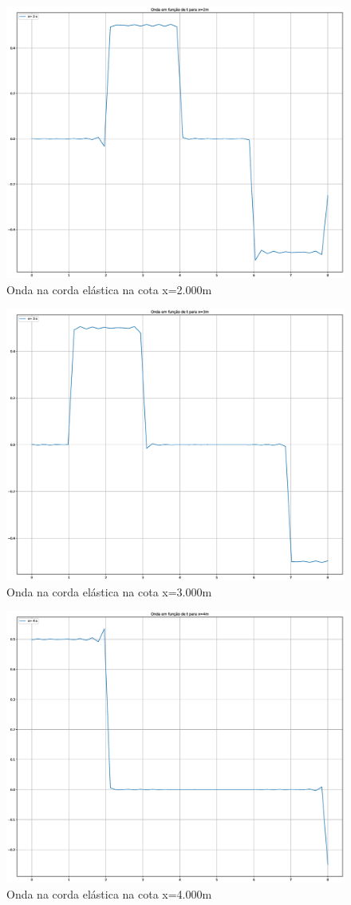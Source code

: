 \documentclass[12pt, a4paper, portuguese]{fphw}
\begin{document}
\begin{figure}[H]
	\centering
	\includegraphics[width=.8\linewidth]{"graficos/grafico_x=2.000m"}
	\caption{Onda na corda elástica na cota x=2.000m}
	\label{fig:grafico-x2}
\end{figure}

\begin{figure}[H]
	\centering
	\includegraphics[width=.8\linewidth]{"graficos/grafico_x=3.000m"}
	\caption{Onda na corda elástica na cota x=3.000m}
	\label{fig:grafico-x3}
\end{figure}

\begin{figure}[H]
	\centering
	\includegraphics[width=.8\linewidth]{"graficos/grafico_x=4.000m"}
	\caption{Onda na corda elástica na cota x=4.000m}
	\label{fig:grafico-x4}
\end{figure}
\end{document}
